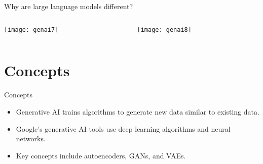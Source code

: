 \begin{frame}[fragile]{Why are large language models different? }
\begin{columns}
    \begin{column}[T]{0.5\linewidth}
\begin{center}
\texttt{[image: genai7]}
\end{center}
    \end{column}
    \begin{column}[T]{0.5\linewidth}  
	
\begin{center}
\texttt{[image: genai8]}
\end{center}

    \end{column}
  \end{columns}
  
  
\end{frame}

\section{Concepts}

\begin{frame}[fragile]{Concepts}
\begin{itemize}
\item Generative AI trains algorithms to generate new data similar to existing data.
\item Google's generative AI tools use deep learning algorithms and neural networks.
\item Key concepts include autoencoders, GANs, and VAEs.
\end{itemize}
\end{frame}


